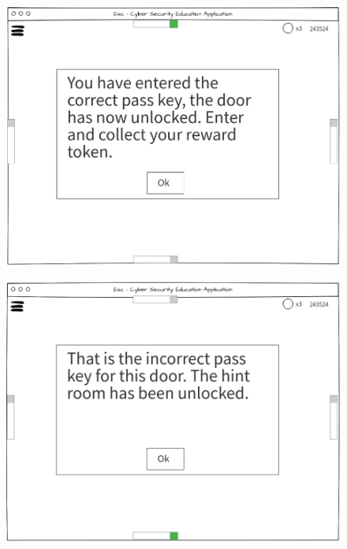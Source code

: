 \documentclass[12pt,a4paper]{article}
\begin{document}
\begin{figure}
\centering
\begin{minipage}{.5\textwidth}
  \centering
  \includegraphics[width=1\linewidth]{Ui_correct_response.PNG}
  \label{fig:test3}
\end{minipage}%
\begin{minipage}{.5\textwidth}
  \centering
  \includegraphics[width=1\linewidth]{Ui_incorrect_response.PNG}
  \label{fig:test4}
\end{minipage}
\end{figure}  
\end{document}
